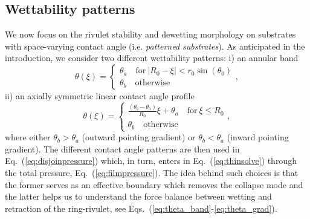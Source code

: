 \documentclass[twoside,twocolumn,9pt]{article}
\begin{document}
\subsection{Wettability patterns}\label{subsec:wettability}
We now focus on the rivulet stability and dewetting morphology on 
substrates with space-varying contact angle (i.e. {\it patterned substrates}).
As anticipated in the introduction, we consider two different wettability patterns: i) an annular band 
\begin{equation}\label{eq:theta_band}
    \theta(\xi) =\begin{cases}
        \theta_a \quad \text{for}~|R_0-\xi| < r_0\sin(\theta_0) \\
        \theta_b\quad \text{otherwise}
    \end{cases},
\end{equation}
ii) an axially symmetric linear contact angle profile
\begin{equation}\label{eq:theta_grad}
    \theta(\xi) =\begin{cases}
        \frac{(\theta_{b}-\theta_{a})}{R_0} \xi + \theta_{a} \quad \text{for}~\xi \leq R_0 \\
        \theta_b \quad \text{otherwise}
    \end{cases},
\end{equation}
where either $\theta_{b} > \theta_{a}$ (outward pointing gradient) or $\theta_b < \theta_a$ (inward pointing
 gradient).
The different contact angle patterns are then used in Eq.~(\ref{eq:disjoinpressure}) which, in turn, enters in Eq.~(\ref{eq:thinsolve}) through the total pressure, Eq.~(\ref{eq:filmpressure}).
The idea behind such choices is that the former serves as an effective boundary which removes the collapse mode and the latter helps us to understand the force balance between wetting and retraction of the ring-rivulet, see Eqs.~(\ref{eq:theta_band}-\ref{eq:theta_grad}).
\end{document}
